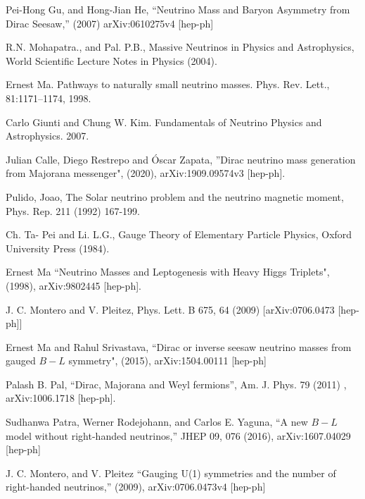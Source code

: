 \documentclass[12pt]{article}
\begin{document}
\begin{thebibliography}{9}

Pei-Hong Gu,  and Hong-Jian He, “Neutrino Mass and Baryon Asymmetry from Dirac Seesaw,”  (2007) arXiv:0610275v4  [hep-ph]

R.N. Mohapatra., and Pal. P.B., Massive Neutrinos in Physics and Astrophysics, World Scientific Lecture Notes in Physics (2004).

Ernest Ma. Pathways to naturally small neutrino masses. Phys.
Rev. Lett., 81:1171–1174, 1998.

Carlo Giunti and Chung W. Kim. Fundamentals of Neutrino
Physics and Astrophysics. 2007.

 Julian Calle, Diego Restrepo and Óscar Zapata, ''Dirac neutrino mass generation from Majorana messenger", (2020), arXiv:1909.09574v3 [hep-ph].

Pulido, Joao, The Solar neutrino problem and the neutrino magnetic moment, Phys. Rep. 211
(1992) 167-199.

Ch. Ta- Pei and Li. L.G., Gauge Theory of Elementary Particle Physics,
Oxford University Press (1984).

Ernest Ma “Neutrino Masses and Leptogenesis
with Heavy Higgs Triplets", (1998), arXiv:9802445 [hep-ph].

J. C. Montero and V. Pleitez, Phys. Lett. B 675, 64 (2009) [arXiv:0706.0473 [hep-ph]]

Ernest Ma and Rahul Srivastava, “Dirac or inverse seesaw neutrino masses from gauged $B-L$  symmetry", (2015), arXiv:1504.00111 [hep-ph]

Palash B. Pal, “Dirac, Majorana and Weyl fermions”, Am. J. Phys. 79 (2011) , arXiv:1006.1718 [hep-ph]. 

Sudhanwa Patra, Werner Rodejohann, and Carlos E. Yaguna, “A new $B-L$  model without right-handed neutrinos,” JHEP 09, 076 (2016), arXiv:1607.04029 [hep-ph]

 J. C. Montero, and V. Pleitez “Gauging U(1) symmetries and the number of right-handed neutrinos,” (2009), arXiv:0706.0473v4 [hep-ph]
\end{thebibliography}




\medskip
\end{document}
